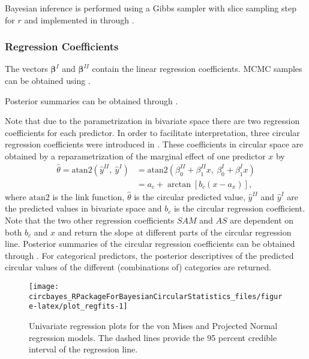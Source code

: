 Bayesian inference is performed using a Gibbs sampler with slice
sampling step for \(r\) \citep{hernandez2017general} and implemented in
 through .

\hypertarget{regression-coefficients}{%
\subsubsection{Regression Coefficients}\label{regression-coefficients}}

The vectors \(\boldsymbol{\beta}^{I}\) and \(\boldsymbol{\beta}^{II}\)
contain the linear regression coefficients. MCMC samples can be obtained
using .

Posterior summaries can be obtained through .

Note that due to the parametrization in bivariate space there are two
regression coefficients for each predictor. In order to facilitate
interpretation, three circular regression coefficients were introduced
in \citet{CremersMulderKlugkist2017}. These coefficients in circular
space are obtained by a reparametrization of the marginal effect of one
predictor \(x\) by \begin{align}
  \label{reparametrization_ch3}
  \hat{\theta} = \text{atan2}\left(\hat{y}^{II}, \:\hat{y}^{I}\right) &= \text{atan2}\left(\beta_{0}^{II} + \beta_{1}^{II} x, \: \beta_{0}^{I} + \beta_{1}^{I} x\right) \nonumber\\
  &= a_c + \arctan\left[b_{c}\left(x - a_{x}\right)\right],
\end{align} where \(\text{atan2}\) is the link function,
\(\hat{\theta}\) is the circular predicted value, \(\hat{y}^{II}\) and
\(\hat{y}^{I}\) are the predicted values in bivariate space and \(b_c\)
is the circular regression coefficient. Note that the two other
regression coefficients \(SAM\) and \(AS\) are dependent on both \(b_c\)
and \(x\) and return the slope at different parts of the circular
regression line. Posterior summaries of the circular regression
coefficients can be obtained through . For
categorical predictors, the posterior descriptives of the predicted
circular values of the different (combinations of) categories are
returned.

\begin{CodeChunk}
\begin{figure}

{\centering \texttt{[image: circbayes\_RPackageForBayesianCircularStatistics\_files/figure-latex/plot\_regfits-1]} 

}

\caption[Univariate regression plots for the von Mises and Projected Normal regression models]{Univariate regression plots for the von Mises and Projected Normal regression models. The dashed lines provide the 95 percent credible interval of the regression line.}\label{fig:plot_regfits}
\end{figure}
\end{CodeChunk}

